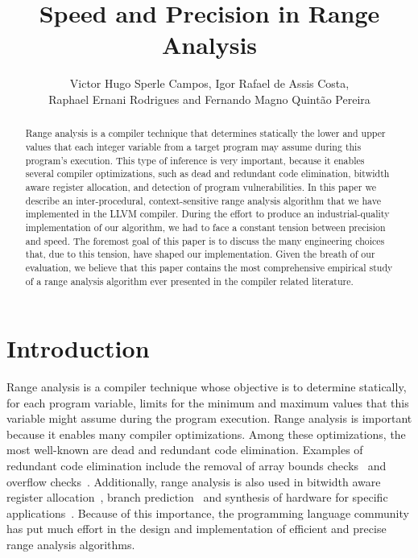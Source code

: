\documentclass{paper}
\begin{document}
\title{Speed and Precision in Range Analysis}

\author{Victor Hugo Sperle Campos, Igor Rafael de Assis Costa,\\
Raphael Ernani Rodrigues and Fernando Magno Quint\~{a}o Pereira}

\address{UFMG -- 6627 Ant\^{o}nio Carlos Av, 31.270-010, Belo Horizonte, Brazil
}


\maketitle

\begin{abstract}
Range analysis is a compiler technique that determines statically the lower and
upper values that each integer variable from a target program may assume
during this program's execution.
This type of inference is very important, because it enables several compiler
optimizations, such as dead and redundant code elimination, bitwidth aware
register allocation, and detection of program vulnerabilities.
In this paper we describe an inter-procedural, context-sensitive range analysis
algorithm that we have implemented in the LLVM compiler.
During the effort to produce an industrial-quality implementation of our
algorithm, we had to face a constant tension between precision and speed.
The foremost goal of this paper is to discuss the many engineering choices
that, due to this tension, have shaped our implementation.
Given the breath of our evaluation, we believe that this paper
contains the most comprehensive empirical study of a range analysis
algorithm ever presented in the compiler related literature.
\end{abstract}

\section{Introduction}
\label{sec:int}

Range analysis is a compiler technique whose objective is to determine
statically, for each program variable, limits for the minimum and maximum
values that this variable might assume during the program execution.
Range analysis is important because it enables many compiler optimizations.
Among these optimizations, the most well-known are dead and redundant
code elimination.
Examples of redundant code elimination include the removal of array bounds
checks~\cite{Bodik00,Logozzo08,Venet04} and overflow checks~\cite{Sol11}.
Additionally, range analysis is also used in bitwidth aware register
allocation~\cite{Barik06,Pereira08,Tallam03}, branch
prediction~\cite{Patterson95} and synthesis of hardware for specific
applications~\cite{Cong05,Lhairech10,Mahlke01,Stephenson00}.
Because of this importance, the programming language community has put much
effort in the design and implementation of efficient and precise range
analysis algorithms.
\end{document}
